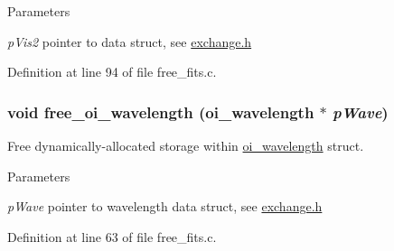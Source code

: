 \begin{DoxyParams}{Parameters}
\item[{\em pVis2}]pointer to data struct, see \hyperlink{exchange_8h}{exchange.h} \end{DoxyParams}


Definition at line 94 of file free\_\-fits.c.

\hypertarget{group__oitable_gad7c24eb342d88ad5f22178426f69fa56}{
\subsubsection[{free\_\-oi\_\-wavelength}]{\setlength{\rightskip}{0pt plus 5cm}void free\_\-oi\_\-wavelength ({\bf oi\_\-wavelength} $\ast$ {\em pWave})}}
\label{group__oitable_gad7c24eb342d88ad5f22178426f69fa56}
Free dynamically-\/allocated storage within \hyperlink{structoi__wavelength}{oi\_\-wavelength} struct.


\begin{DoxyParams}{Parameters}
\item[{\em pWave}]pointer to wavelength data struct, see \hyperlink{exchange_8h}{exchange.h} \end{DoxyParams}


Definition at line 63 of file free\_\-fits.c.

